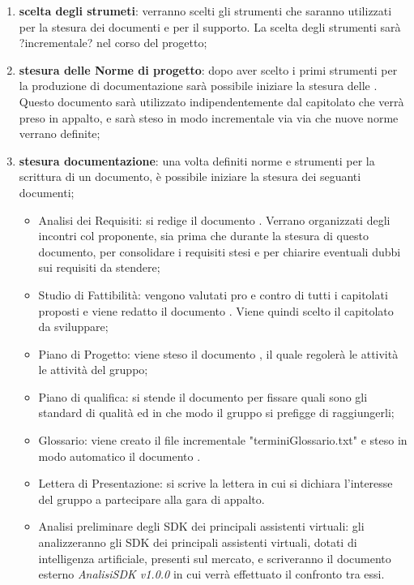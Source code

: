 \documentclass[./PianoDiProgetto.tex]{subfiles}
\begin{document}
  \begin{enumerate}
		\item \textbf{scelta degli strumeti}: verranno scelti gli strumenti che saranno utilizzati per la stesura dei documenti e per il supporto. La scelta degli strumenti sarà ?incrementale? nel corso del progetto;
		\item \textbf{stesura delle Norme di progetto}: dopo aver scelto i primi strumenti per la produzione di documentazione sarà possibile iniziare la stesura delle \NPdocRR. Questo documento sarà utilizzato indipendentemente dal capitolato che verrà preso in appalto, e sarà steso in modo incrementale via via che nuove norme verrano definite;
		\item \textbf{stesura documentazione}: una volta definiti norme e strumenti per la scrittura di un documento, è possibile iniziare la stesura dei seguanti documenti;
    \begin{itemize}
      \item Analisi dei Requisiti: si redige il documento \ARdocRR. Verrano organizzati degli incontri col proponente, sia prima che durante la stesura di questo documento, per consolidare i requisiti stesi e per chiarire eventuali dubbi sui requisiti da stendere;
      \item Studio di Fattibilità: vengono valutati pro e contro di tutti i capitolati proposti e viene redatto il documento \SFdocRR. Viene quindi scelto il capitolato da sviluppare;
      \item Piano di Progetto: viene steso il documento \PPdocRR, il quale regolerà le attività le attività del gruppo;
      \item Piano di qualifica: si stende il documento \PQdocRR per fissare quali sono gli standard di qualità ed in che modo il gruppo si prefigge di raggiungerli;
      \item Glossario: viene creato il file incrementale "terminiGlossario.txt" e steso in modo automatico il documento \GldocRR.
      \item Lettera di Presentazione: si scrive la lettera in cui si dichiara l'interesse del gruppo a partecipare alla gara di appalto.
      \item Analisi preliminare degli SDK dei principali assistenti virtuali: gli \ANP{} analizzeranno gli SDK dei principali assistenti virtuali, dotati di intelligenza artificiale, presenti sul mercato, e scriveranno il documento esterno \textit{AnalisiSDK v1.0.0} in cui verrà effettuato il confronto tra  essi.
    \end{itemize}
  \end{enumerate}
  \newpage
\end{document}

